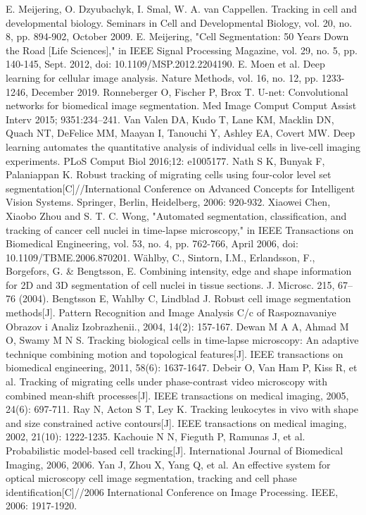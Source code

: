\documentclass[conference]{IEEEtran}
\begin{document}
\begin{thebibliography}{00}
 E. Meijering, O. Dzyubachyk, I. Smal, W. A. van Cappellen. Tracking in cell and developmental biology. Seminars in Cell and Developmental Biology, vol. 20, no. 8, pp. 894-902, October 2009.
 E. Meijering, "Cell Segmentation: 50 Years Down the Road [Life Sciences]," in IEEE Signal Processing Magazine, vol. 29, no. 5, pp. 140-145, Sept. 2012, doi: 10.1109/MSP.2012.2204190.
 E. Moen et al. Deep learning for cellular image analysis. Nature Methods, vol. 16, no. 12, pp. 1233-1246, December 2019. 
 Ronneberger O, Fischer P, Brox T. U-net: Convolutional networks for biomedical image segmentation. Med Image Comput Comput Assist Interv 2015; 9351:234–241.
 Van Valen DA, Kudo T, Lane KM, Macklin DN, Quach NT, DeFelice MM, Maayan I, Tanouchi Y, Ashley EA, Covert MW. Deep learning automates the quantitative analysis of individual cells in live-cell imaging experiments. PLoS Comput Biol 2016;12: e1005177.
Nath S K, Bunyak F, Palaniappan K. Robust tracking of migrating cells using four-color level set segmentation[C]//International Conference on Advanced Concepts for Intelligent Vision Systems. Springer, Berlin, Heidelberg, 2006: 920-932.
 Xiaowei Chen, Xiaobo Zhou and S. T. C. Wong, "Automated segmentation, classification, and tracking of cancer cell nuclei in time-lapse microscopy," in IEEE Transactions on Biomedical Engineering, vol. 53, no. 4, pp. 762-766, April 2006, doi: 10.1109/TBME.2006.870201.
 Wählby, C., Sintorn, I.M., Erlandsson, F., Borgefors, G. \& Bengtsson, E. Combining intensity, edge and shape information for 2D and 3D segmentation of cell nuclei in tissue sections. J. Microsc. 215, 67–76 (2004).
 Bengtsson E, Wahlby C, Lindblad J. Robust cell image segmentation methods[J]. Pattern Recognition and Image Analysis C/c of Raspoznavaniye Obrazov i Analiz Izobrazhenii., 2004, 14(2): 157-167.
 Dewan M A A, Ahmad M O, Swamy M N S. Tracking biological cells in time-lapse microscopy: An adaptive technique combining motion and topological features[J]. IEEE transactions on biomedical engineering, 2011, 58(6): 1637-1647.
 Debeir O, Van Ham P, Kiss R, et al. Tracking of migrating cells under phase-contrast video microscopy with combined mean-shift processes[J]. IEEE transactions on medical imaging, 2005, 24(6): 697-711.
 Ray N, Acton S T, Ley K. Tracking leukocytes in vivo with shape and size constrained active contours[J]. IEEE transactions on medical imaging, 2002, 21(10): 1222-1235.
 Kachouie N N, Fieguth P, Ramunas J, et al. Probabilistic model-based cell tracking[J]. International Journal of Biomedical Imaging, 2006, 2006.
 Yan J, Zhou X, Yang Q, et al. An effective system for optical microscopy cell image segmentation, tracking and cell phase identification[C]//2006 International Conference on Image Processing. IEEE, 2006: 1917-1920.


\end{thebibliography}
\end{document}
